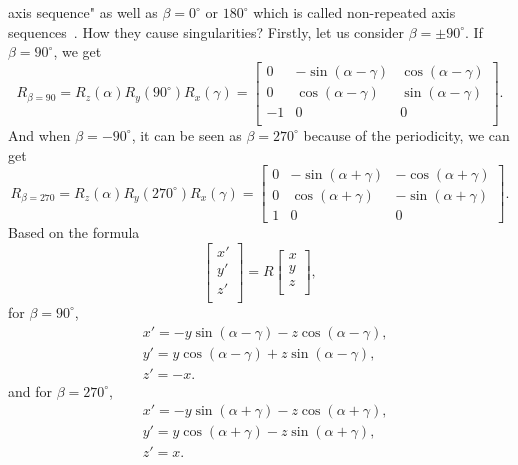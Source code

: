 axis sequence" as well as $\beta=0^{\circ}$ or $180^{\circ}$ which is called non-repeated axis
sequences~\cite{r17,r19}. How they cause singularities? Firstly, let us consider $\beta=\pm90^{\circ}$. If $\beta=90^{\circ}$, we get 
\begin{equation}
R_{\beta=90}=R_{z}(\alpha)R_{y}(90^{\circ})R_{x}(\gamma)=
\begin{bmatrix}
0&-\sin(\alpha-\gamma)&\cos(\alpha-\gamma)\\
0&\cos(\alpha-\gamma)&\sin(\alpha-\gamma)\\
         -1&                              0&0\\
\end{bmatrix}.
\end{equation}
And when $\beta=-90^{\circ}$, it can be seen as $\beta=270^{\circ}$ because of the periodicity, we can get 
\begin{equation}
R_{\beta=270}=R_{z}(\alpha)R_{y}(270^{\circ})R_{x}(\gamma)=
\begin{bmatrix}
0&-\sin(\alpha+\gamma)&-\cos(\alpha+\gamma)\\
0&\cos(\alpha+\gamma)&-\sin(\alpha+\gamma)\\
1&                               0&0
\end{bmatrix}.
\end{equation}
Based on the formula
\begin{equation}
\begin{bmatrix}
x'\\
y'\\
z'\\
\end{bmatrix}
=R
\begin{bmatrix}
x\\
y\\
z\\
\end{bmatrix},
\end{equation}
for $\beta=90^{\circ}$,
\begin{equation}
\label{equation:beta=90}
\begin{aligned}
&x'=-y\sin(\alpha-\gamma)-z\cos(\alpha-\gamma), \\
&y'=y\cos(\alpha-\gamma)+z\sin(\alpha-\gamma), \\
&z'=-x. 
\end{aligned}
\end{equation}
and for $\beta=270^{\circ}$, 
\begin{equation}
\label{equation:beta=270}
\begin{aligned}
&x'=-y\sin(\alpha+\gamma)-z\cos(\alpha+\gamma), \\
&y'=y\cos(\alpha+\gamma)-z\sin(\alpha+\gamma), \\
&z'=x.
\end{aligned}
\end{equation}
